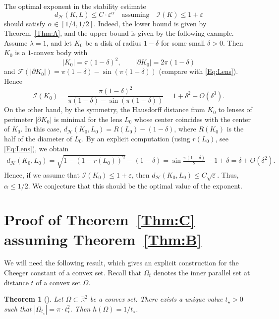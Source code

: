 \documentclass[11pt, oneside]{amsart}
\newcommand{\R}{\mathbb{R}}
\newcommand{\dH}{d_{\mathcal H}}
\newcommand{\Ll}{\mathcal{I}}
\newcommand{\eps}{\varepsilon}
\renewcommand{\le}{\leqslant}
\theoremstyle{theorem}
\newtheorem{theorem}{Theorem}[section]
\theoremstyle{Intro}
\theoremstyle{definition}
\theoremstyle{remark}
\theoremstyle{claim}
\numberwithin{equation}{section}
\begin{document}
The optimal exponent in the stability estimate 
\[
\dH(K,L) \le C \cdot \eps^\alpha \quad \text{assuming} \quad \Ll(K) \le 1+\eps
\] should satisfy 
$\alpha \in [1/4,1/2].$
Indeed, the lower bound is given by Theorem~\ref{Thm:A}, and the upper bound is given by the following example. Assume $\lambda=1$, and let $K_0$ be a disk of radius $1-\delta$ for some small $\delta >0$. Then $K_0$ is a $1$-convex body with 
\[
|K_0| = \pi (1-\delta)^2, \qquad |\partial K_0| = 2\pi(1-\delta)
\]
and $\mathcal F(|\partial K_0|) = \pi(1-\delta) - \sin(\pi(1-\delta))$ (compare with \eqref{Eq:Lens}). Hence
\[
\Ll(K_0) = \frac{\pi(1-\delta)^2}{\pi(1-\delta)-\sin(\pi(1-\delta))} = 1+\delta^2+O(\delta^3).
\]
On the other hand, by the symmetry, the Hausdorff distance from $K_0$ to lenses of perimeter $|\partial K_0|$ is minimal for the lens $L_0$ whose center coincides with the center of $K_0$. In this case, $\dH(K_0,L_0) = R(L_0)-(1-\delta)$, where $R(K_0)$ is the half of the diameter of $L_0$. By an explicit computation (using $r(L_0)$, see \eqref{Eq:Lens}), we obtain
\begin{equation*}
\begin{aligned}
    \dH(K_0,L_0) %
    = \sqrt{1-(1-r(L_0))^2}-(1-\delta) = \sin \frac{\pi(1-\delta)}{2}-1+\delta = \delta + O(\delta^2).
\end{aligned}    
\end{equation*}
Hence, if we assume that $\Ll(K_0) \le 1+\eps$, then $\dH(K_0,L_0) \le C\sqrt{\eps}$. Thus, $\alpha \le 1/2$. We conjecture that this should be the optimal value of the exponent.

\section{Proof of Theorem~\ref{Thm:C} assuming Theorem~\ref{Thm:B}}
\label{Sec:ProofThmC}

We will need the following result, which gives an explicit construction for the Cheeger constant of a convex set. Recall that $\Omega_t$ denotes the inner parallel set at distance $t$ of a convex set $\Omega$.

\begin{theorem}[\cite{KLR}]
    \label{Thm:Cheeger}
    Let $\Omega \subset \R^2$ be a convex set. There exists a unique value $t_\star > 0$ such that $|\Omega_{t_\star}| = \pi \cdot t_\star^2$. Then $h(\Omega) = 1/t_\star$.
\end{theorem}
\end{document}
